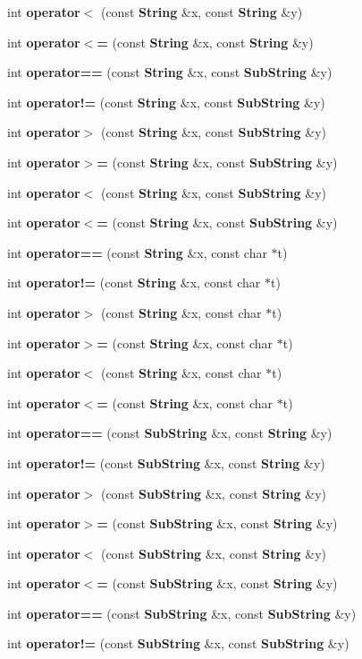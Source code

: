\begin{CompactItemize}
\item 
int {\bf operator$<$} (const {\bf String} \&x, const {\bf String} \&y)
\item 
int {\bf operator$<$=} (const {\bf String} \&x, const {\bf String} \&y)
\item 
int {\bf operator==} (const {\bf String} \&x, const {\bf Sub\-String} \&y)
\item 
int {\bf operator!=} (const {\bf String} \&x, const {\bf Sub\-String} \&y)
\item 
int {\bf operator$>$} (const {\bf String} \&x, const {\bf Sub\-String} \&y)
\item 
int {\bf operator$>$=} (const {\bf String} \&x, const {\bf Sub\-String} \&y)
\item 
int {\bf operator$<$} (const {\bf String} \&x, const {\bf Sub\-String} \&y)
\item 
int {\bf operator$<$=} (const {\bf String} \&x, const {\bf Sub\-String} \&y)
\item 
int {\bf operator==} (const {\bf String} \&x, const char $\ast$t)
\item 
int {\bf operator!=} (const {\bf String} \&x, const char $\ast$t)
\item 
int {\bf operator$>$} (const {\bf String} \&x, const char $\ast$t)
\item 
int {\bf operator$>$=} (const {\bf String} \&x, const char $\ast$t)
\item 
int {\bf operator$<$} (const {\bf String} \&x, const char $\ast$t)
\item 
int {\bf operator$<$=} (const {\bf String} \&x, const char $\ast$t)
\item 
int {\bf operator==} (const {\bf Sub\-String} \&x, const {\bf String} \&y)
\item 
int {\bf operator!=} (const {\bf Sub\-String} \&x, const {\bf String} \&y)
\item 
int {\bf operator$>$} (const {\bf Sub\-String} \&x, const {\bf String} \&y)
\item 
int {\bf operator$>$=} (const {\bf Sub\-String} \&x, const {\bf String} \&y)
\item 
int {\bf operator$<$} (const {\bf Sub\-String} \&x, const {\bf String} \&y)
\item 
int {\bf operator$<$=} (const {\bf Sub\-String} \&x, const {\bf String} \&y)
\item 
int {\bf operator==} (const {\bf Sub\-String} \&x, const {\bf Sub\-String} \&y)
\item 
int {\bf operator!=} (const {\bf Sub\-String} \&x, const {\bf Sub\-String} \&y)

\end{CompactItemize}
